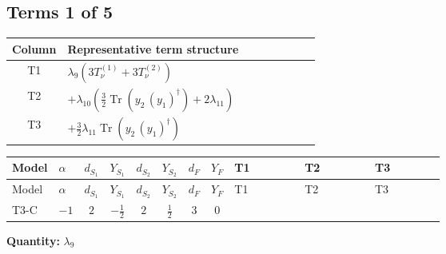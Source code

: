 \documentclass[8pt]{article}
\begin{document}
\begin{landscape}
\subsection*{Terms 1 of 5}
\begin{center}
\begin{tabular}{@{}c >{\raggedright\arraybackslash}p{0.82\linewidth}@{}}
\toprule
Column & Representative term structure \\
\midrule
T1 & \(\displaystyle {\lambda_{9}} (3 T_{\nu}^{(1)}+3 T_{\nu}^{(2)})\) \\
\midrule
T2 & \(\displaystyle +{\lambda_{10}} \left(\frac{3}{2} \operatorname{Tr}\!\left({y_2}\,\left({y_1}\right)^{\dagger}\right)+2 {\lambda_{11}}\right)\) \\
\midrule
T3 & \(\displaystyle +\frac{3}{2} {\lambda_{11}} \operatorname{Tr}\!\left({y_2}\,\left({y_1}\right)^{\dagger}\right)\) \\
\midrule
\bottomrule
\end{tabular}
\end{center}
\smallskip
\tiny
\begin{longtable}{@{}llcccccc >{\raggedright\arraybackslash}p{0.21\linewidth} >{\raggedright\arraybackslash}p{0.21\linewidth} >{\raggedright\arraybackslash}p{0.21\linewidth}@{}}
\toprule
Model & $\alpha$ & $d_{S_1}$ & $Y_{S_1}$ & $d_{S_2}$ & $Y_{S_2}$ & $d_F$ & $Y_F$ & T1 & T2 & T3 \\
\midrule
\endfirsthead
\toprule
Model & $\alpha$ & $d_{S_1}$ & $Y_{S_1}$ & $d_{S_2}$ & $Y_{S_2}$ & $d_F$ & $Y_F$ & T1 & T2 & T3 \\
\midrule
\endhead
T3-C & $-1$ & $2$ & $-\frac{1}{2}$ & $2$ & $\frac{1}{2}$ & $3$ & $0$ & \scriptsize\adjustbox{max width=\linewidth}{$\begin{gathered} {\lambda_{9}} (3 T_{\nu}^{(1)}+3 T_{\nu}^{(2)})\end{gathered}$} & \scriptsize\adjustbox{max width=\linewidth}{$\begin{gathered} +{\lambda_{10}} \left(\frac{3}{2} \operatorname{Tr}\!\left({y_2}\,\left({y_1}\right)^{\dagger}\right)+2 {\lambda_{11}}\right)\end{gathered}$} & \scriptsize\adjustbox{max width=\linewidth}{$\begin{gathered} +\frac{3}{2} {\lambda_{11}} \operatorname{Tr}\!\left({y_2}\,\left({y_1}\right)^{\dagger}\right)\end{gathered}$} \\
\midrule
\bottomrule
\end{longtable}
\clearpage
\noindent\textbf{Quantity: }$\lambda_{9}$\par\smallskip

\end{landscape}
\end{document}
